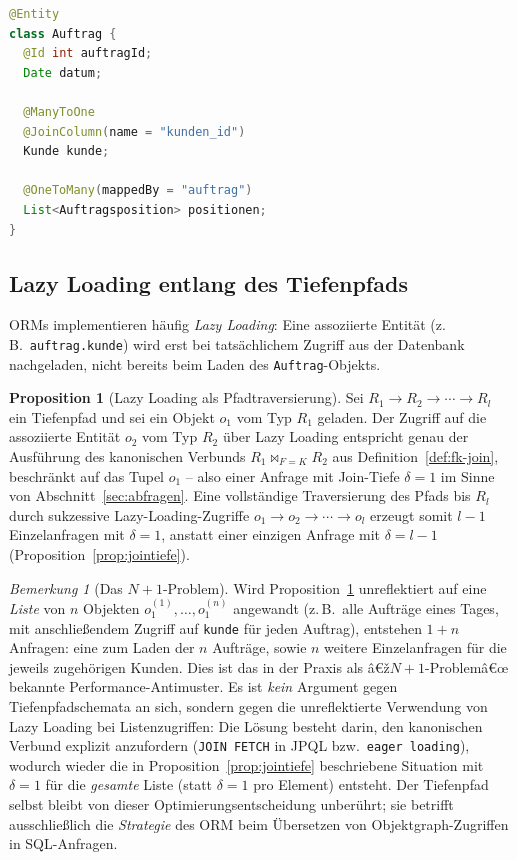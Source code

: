 ﻿\documentclass[a4paper,12pt]{report}
\theoremstyle{definition}
\newtheorem{proposition}[theorem]{Proposition}
\theoremstyle{remark}
\newtheorem{remark}{Bemerkung}[chapter]
\begin{document}
\begin{lstlisting}[language=Java]
@Entity
class Auftrag {
  @Id int auftragId;
  Date datum;

  @ManyToOne
  @JoinColumn(name = "kunden_id")
  Kunde kunde;

  @OneToMany(mappedBy = "auftrag")
  List<Auftragsposition> positionen;
}
\end{lstlisting}

\subsection{Lazy Loading entlang des Tiefenpfads}
\label{sec:lazy-loading}

ORMs implementieren häufig \emph{Lazy Loading}: Eine assoziierte
Entität (z.\,B.\ \texttt{auftrag.kunde}) wird erst bei tatsächlichem
Zugriff aus der Datenbank nachgeladen, nicht bereits beim Laden des
\texttt{Auftrag}-Objekts.

\begin{proposition}[Lazy Loading als Pfadtraversierung]
\label{prop:lazy-loading}
Sei $R_1\to R_2\to\cdots\to R_l$ ein Tiefenpfad und sei ein Objekt
$o_1$ vom Typ $R_1$ geladen. Der Zugriff auf die assoziierte Entität
$o_2$ vom Typ $R_2$ über Lazy Loading entspricht genau der Ausführung
des kanonischen Verbunds $R_1\Join_{F=K}R_2$ aus
Definition~\ref{def:fk-join}, beschränkt auf das Tupel $o_1$ -- also
einer Anfrage mit Join-Tiefe $\delta=1$ im Sinne von
Abschnitt~\ref{sec:abfragen}. Eine vollständige Traversierung des
Pfads bis $R_l$ durch sukzessive Lazy-Loading-Zugriffe
$o_1\to o_2\to\cdots\to o_l$ erzeugt somit $l-1$ Einzelanfragen mit
$\delta=1$, anstatt einer einzigen Anfrage mit $\delta=l-1$
(Proposition~\ref{prop:jointiefe}).
\end{proposition}

\begin{remark}[Das $N{+}1$-Problem]
\label{rem:n-plus-1}
Wird Proposition~\ref{prop:lazy-loading} unreflektiert auf eine
\emph{Liste} von $n$ Objekten $o_1^{(1)},\ldots,o_1^{(n)}$ angewandt
(z.\,B.\ alle Aufträge eines Tages, mit anschließendem Zugriff auf
\texttt{kunde} für jeden Auftrag), entstehen $1+n$ Anfragen: eine zum
Laden der $n$ Aufträge, sowie $n$ weitere Einzelanfragen für die
jeweils zugehörigen Kunden. Dies ist das in der Praxis als
â€ž$N{+}1$-Problemâ€œ bekannte Performance-Antimuster. Es ist
\emph{kein} Argument gegen Tiefenpfadschemata an sich, sondern gegen
die unreflektierte Verwendung von Lazy Loading bei Listenzugriffen:
Die Lösung besteht darin, den kanonischen Verbund explizit
anzufordern (\texttt{JOIN FETCH} in JPQL bzw.\ \texttt{eager
loading}), wodurch wieder die in
Proposition~\ref{prop:jointiefe} beschriebene Situation mit
$\delta=1$ für die \emph{gesamte} Liste (statt $\delta=1$ pro Element)
entsteht. Der Tiefenpfad selbst bleibt von dieser
Optimierungsentscheidung unberührt; sie betrifft ausschließlich die
\emph{Strategie} des ORM beim Übersetzen von Objektgraph-Zugriffen in
SQL-Anfragen.
\end{remark}
\end{document}
